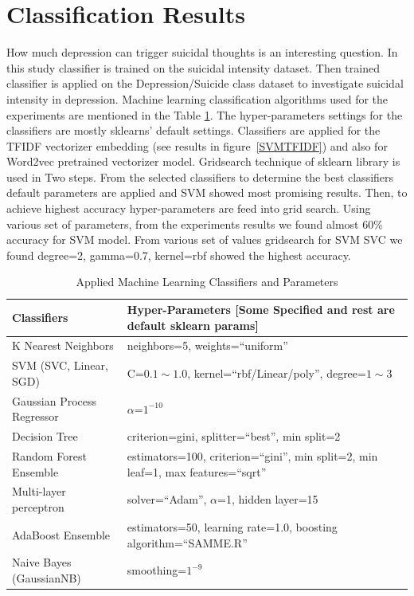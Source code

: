 \documentclass[sn-mathphys,Numbered]{sn-jnl}%
\theoremstyle{thmstyleone}%
\theoremstyle{thmstyletwo}%
\theoremstyle{thmstylethree}%
\begin{document}
\section{Classification Results}
\label{classification_res}
How much depression can trigger suicidal thoughts is an interesting question. In this study classifier is trained on the suicidal intensity dataset. Then trained classifier is applied on the Depression/Suicide class dataset to investigate suicidal intensity in depression. Machine learning classification algorithms used for the experiments are mentioned in the Table \ref{Table_classification_alg}. The hyper-parameters settings for the classifiers are mostly sklearns' default settings. Classifiers are applied for the TFIDF vectorizer embedding (see results in figure~\ref{SVMTFIDF}) and also for Word2vec pretrained vectorizer model. Gridsearch technique of sklearn library is used in Two steps. From the selected classifiers to determine the best classifiers default parameters are applied and SVM showed most promising results. Then, to achieve highest accuracy hyper-parameters are feed into grid search. Using various set of parameters, from the experiments results we found almost 60\% accuracy for SVM model. From various set of values gridsearch for SVM SVC we found degree=2, gamma=0.7, kernel=rbf showed the highest accuracy. 
%
\begin{table}[h]
\begin{center}
\begin{flushleft}
\caption{Applied Machine Learning Classifiers and Parameters}\label{Table_classification_alg}%
\begin{tabular}{|l|p{8cm}|}
\toprule
\textbf{Classifiers} & \textbf{Hyper-Parameters [Some Specified and rest are default sklearn params]} \\
\midrule
K Nearest Neighbors & neighbors=5,  weights=\enquote{uniform} \\
SVM (SVC, Linear, SGD)& C=$0.1\sim 1.0$, kernel=\enquote{rbf/Linear/poly}, degree=$1\sim 3$\\
Gaussian Process Regressor & $\alpha$=$1^{-10}$ \\
Decision Tree & criterion=gini, splitter=\enquote{best}, min split=2  \\
Random Forest Ensemble & estimators=100, criterion=\enquote{gini}, min split=2, min leaf=1, max features=\enquote{sqrt}\\
Multi-layer perceptron & solver=\enquote{Adam}, $\alpha$=1, hidden layer=15 \\
AdaBoost Ensemble & estimators=50, learning rate=1.0, boosting algorithm=\enquote{SAMME.R}\\
Naive Bayes (GaussianNB) & smoothing=$1^{-9}$\\
\bottomrule
\end{tabular}
\end{flushleft}
\end{center}
\end{table}
\end{document}
